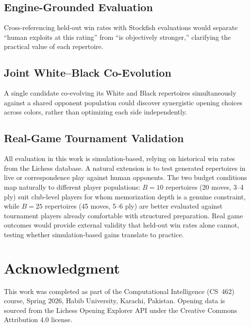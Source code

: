 \documentclass[conference]{IEEEtran}
\begin{document}
\subsection{Engine-Grounded Evaluation}
Cross-referencing held-out win rates with Stockfish evaluations would
separate ``human exploits at this rating'' from ``is objectively stronger,'' clarifying the practical value of each repertoire.

\subsection{Joint White--Black Co-Evolution}
A single candidate co-evolving its White and Black repertoires simultaneously against a shared opponent population could discover synergistic opening choices across colors, rather than optimizing each side independently.

\subsection{Real-Game Tournament Validation}
All evaluation in this work is simulation-based, relying on historical win rates from the Lichess database. A natural extension is to test generated repertoires in live or correspondence play against human opponents. The two budget conditions map naturally to different player populations: $B = 10$ repertoires (20 moves, 3--4 ply) suit club-level players for whom memorization depth is a genuine constraint, while $B = 25$ repertoires (45 moves, 5--6 ply) are better evaluated against tournament players already comfortable with structured preparation. Real game outcomes would provide external validity that held-out win rates alone cannot, testing whether simulation-based gains translate to practice.
\section*{Acknowledgment}

This work was completed as part of the Computational Intelligence
(CS~462) course, Spring 2026, Habib University, Karachi, Pakistan. Opening data is sourced from the Lichess Opening Explorer API under the Creative Commons Attribution 4.0 license.



\end{document}
